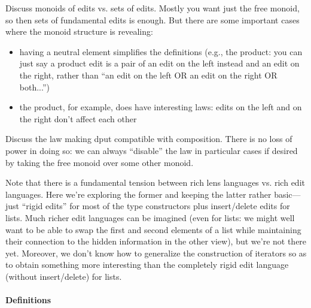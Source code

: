 \begin{defn}[$R$-similarity]
\begin{theorem}
\begin{lemma}
\begin{theorem}[No products]
\begin{lemma}
\begin{defn}
\begin{theorem}
\begin{theorem}
\begin{corollary}[Hylomorphism]
\begin{defn}
\begin{defn}
\begin{defn}[Symmetrization]
\begin{theorem}
Discuss monoids of edits vs. sets of edits.  Mostly you want just the free
monoid, so then sets of fundamental edits is enough.  But there are some
important cases where the monoid structure is revealing:
\begin{itemize}
\item having a neutral element simplifies the definitions (e.g., the
product: you can just say a product edit is a pair of an edit on the left
instead and an edit on the right, rather than ``an edit on the left OR an
edit on the right OR both...'')
\item the product, for example, does have interesting laws: edits on the
left and on the right don't affect each other
\end{itemize}

Discuss the law making dput compatible with composition.  There is no loss
of power in doing so: we can always ``disable'' the law in particular cases
if desired by taking the free monoid over some other monoid.  \fi

Note that there is a fundamental tension between rich lens languages vs.
rich edit languages.  Here we're exploring the former and keeping the latter
rather basic---just ``rigid edits'' for most of the type constructors plus
insert/delete edits for lists.  Much richer edit languages can be imagined
(even for lists: we might well want to be able to swap the first and second
elements of a list while maintaining their connection to the hidden
information in the other view), but we're not there yet.  Moreover, we don't
know how to generalize the construction of iterators so as to obtain
something more interesting than the completely rigid edit language (without
insert/delete) for lists.

\paragraph*{Definitions}


\end{theorem}
\end{defn}
\end{defn}
\end{defn}
\end{corollary}
\end{theorem}
\end{theorem}
\end{defn}
\end{lemma}
\end{theorem}
\end{lemma}
\end{theorem}
\end{defn}
